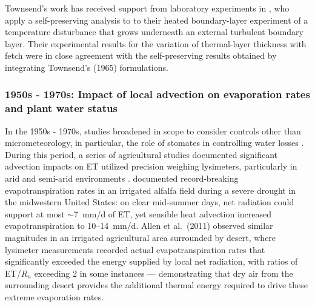 \documentclass{article}
\begin{document}
    
    
    Townsend's work has received support from laboratory experiments in \citet{antonia1977response}, who apply a self-preserving analysis to to their heated boundary-layer experiment of a temperature disturbance that grows underneath an external turbulent boundary layer. Their experimental results for the variation of thermal-layer thickness with fetch were in close agreement with the self-preserving results obtained by integrating Townsend's (1965) formulations.
     
    
    \subsubsection*{1950s - 1970s: Impact of local advection on evaporation rates and plant water status}
    
    In the 1950s - 1970s, studies broadened in scope to consider controls other than micrometeorology, in particular, the role of stomates in controlling water losses  \cite{el1965effects, millar1964effect}.
    During this period, a series of agricultural studies documented significant advection impacts on ET utilized precision weighing lysimeters, particularly in arid and semi-arid environments \cite{rosenberg_extreme_1978}. 
    \citet{rosenberg1978extreme} documented record-breaking evapotranspiration rates in an irrigated alfalfa field during a severe drought in the midwestern United States: on clear mid-summer days, net radiation could support at most $\sim$7~mm/d of ET, yet sensible heat advection increased evapotranspiration to 10--14~mm/d.
    Allen et al.\ (2011) observed similar magnitudes in an irrigated agricultural area surrounded by desert, where lysimeter measurements recorded actual evapotranspiration rates that significantly exceeded the energy supplied by local net radiation, with ratios of ET/$R_n$ exceeding 2 in some instances --- demonstrating that dry air from the surrounding desert provides the additional thermal energy required to drive these extreme evaporation rates.
        
\end{document}
